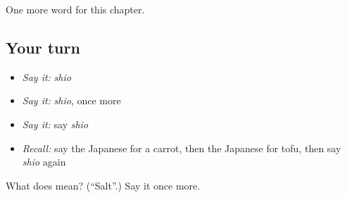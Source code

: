 \begin{grammarlens}[title={What you've built}]
One more word for this chapter.
\end{grammarlens}

\subsection*{Your turn}
\begin{itemize}
\raggedright
  \item \emph{Say it:} \emph{shio}
  \item \emph{Say it:} \emph{shio}, once more
  \item \emph{Say it:} say \emph{shio}
  \item \emph{Recall:} say the Japanese for a carrot, then the Japanese for tofu, then say \emph{shio} again
\end{itemize}

\begin{tcolorbox}[breakable,colback=teal!4,colframe=teal!35!black,title={Before you move on}]
What does  mean? (\textquotedblleft{}Salt\textquotedblright{}.) Say it once more.
\end{tcolorbox}
